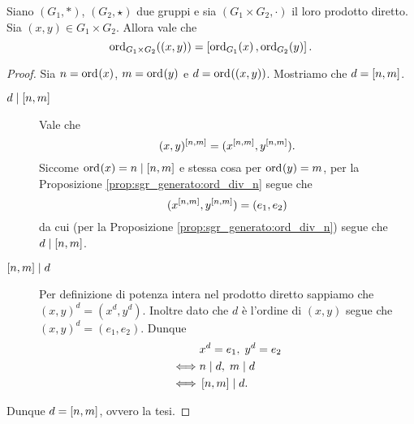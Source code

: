 \begin{proposition}
    \label{prop:ord_prod_diretto}
    Siano $(G_1, *)$, $(G_2, \star)$ due gruppi e sia $(G_1 \times G_2, \cdot)$ il loro prodotto diretto. Sia $(x, y) \in G_1 \times G_2$. Allora vale che \[
        \ord[G_1 \times G_2]{(x, y)} = \mcm{\ord[G_1]{x}}{\ord[G_2]{y}}.    
    \]
\end{proposition}
\begin{proof}
    Sia $n = \ord{x}$, $m = \ord y$ e $d = \ord{(x, y)}$. Mostriamo che $d = \mcm{n}{m}$.
    \begin{description}
        \item[$d \divides \mcm{n}{m}$] Vale che \[
            (x, y)^{\mcm{n}{m}} = (x^{\mcm{n}{m}}, y^{\mcm{n}{m}}).   
        \] Siccome $\ord x = n \divides \mcm{n}{m}$ e stessa cosa per $\ord y = m$, per la Proposizione \ref{prop:sgr_generato:ord_div_n} segue che \begin{equation*}
            (x^{\mcm{n}{m}}, y^{\mcm{n}{m}}) = (e_1, e_2)
        \end{equation*}
        da cui (per la Proposizione \ref{prop:sgr_generato:ord_div_n}) segue che $d \divides \mcm{n}{m}$.
        \item[$\mcm{n}{m} \divides d$] Per definizione di potenza intera nel prodotto diretto sappiamo che $(x, y)^d = (x^d, y^d)$. Inoltre dato che $d$ è l'ordine di $(x, y)$ segue che $(x, y)^d = (e_1, e_2)$. Dunque \begin{align*}
            &x^d = e_1, \; y^d = e_2\\
            \iff &n \divides d, \; m \divides d \\
            \iff &\mcm{n}{m} \divides d.
        \end{align*}
    \end{description}
    Dunque $d = \mcm{n}{m}$, ovvero la tesi.
\end{proof}


